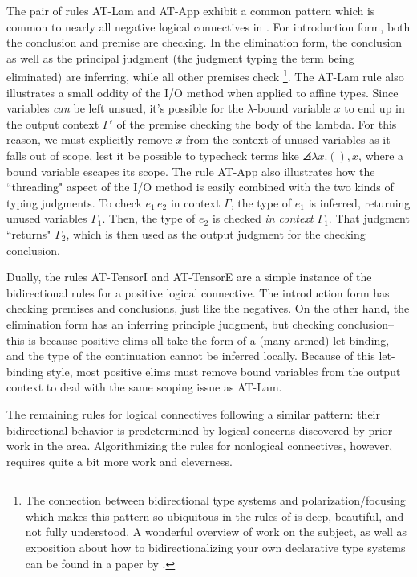 The pair of rules AT-Lam and AT-App exhibit a common pattern which is common to nearly all negative logical connectives in \bilambdaamor. For introduction form, both the conclusion and premise are checking. In the elimination form, the conclusion as well as the principal judgment (the judgment typing the term being eliminated) are inferring, while all other premises check
\footnote{
The connection between bidirectional type systems and polarization/focusing which makes this pattern so ubiquitous in the rules of \bilambdaamor is deep, beautiful, and not fully understood. A wonderful overview of work on the subject, as well as exposition about how to bidirectionalizing your own declarative type systems can be found in a paper by \citet{dunfield19:bidir-survey}.
}.
The AT-Lam rule also illustrates a small oddity of the I/O method when applied to affine types. Since variables \textit{can} be left unsued, it's possible for the $\lambda$-bound variable $x$ to end up in the output context $\Gamma'$ of the premise checking the body of the lambda. For this reason, we must explicitly remove $x$ from the context of unused variables as it falls out of scope, lest it be possible to typecheck terms like $\angles{\lambda x. (), x}$, where a bound variable escapes its scope. The rule AT-App also illustrates how the ``threading" aspect of the I/O method is easily combined with the two kinds of typing judgments. To check $e_1 \, e_2$ in context $\Gamma$, the type of $e_1$ is inferred, returning unused variables $\Gamma_1$. Then, the type of $e_2$ is checked \textit{in context $\Gamma_1$}. That judgment ``returns" $\Gamma_2$, which is then used as the output judgment for the checking conclusion.

Dually, the rules AT-TensorI and AT-TensorE are a simple instance of the bidirectional rules for a positive logical connective. The introduction form has checking premises and conclusions, just like the negatives. On the other hand, the elimination form has an inferring principle judgment, but checking conclusion-- this is because positive elims all take the form of a (many-armed) let-binding, and the type of the continuation cannot be inferred locally. Because of this let-binding style, most positive elims must remove bound variables from the output context to deal with the same scoping issue as AT-Lam.

The remaining rules for logical connectives following a similar pattern: their bidirectional behavior is predetermined by logical concerns discovered by prior work in the area. Algorithmizing the rules for nonlogical connectives, however, requires quite a bit more work and cleverness.

